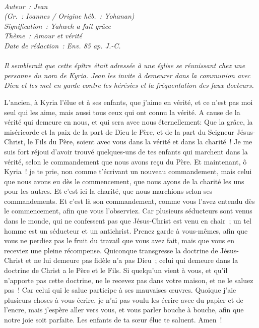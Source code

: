 \BFont
\noindent\hrulefill
{\footnotesize
\textit{
\bigskip
{\centering{}
\\Auteur~: Jean
\\(Gr.~: Ioannes / Origine héb.~: Yohanan)
\\Signification~: Yahweh a fait grâce
\\Thème~: Amour et vérité
\\Date de rédaction~: Env. 85 ap. J.-C.\\}
}
\textit{
\\Il semblerait que cette épître était adressée à une église se réunissant chez une personne du nom de Kyria. Jean les invite à demeurer dans la communion avec Dieu et les met en garde contre les hérésies et la fréquentation des faux docteurs.\bigskip
}
}
\par\nobreak\noindent\hrulefill
\begin{multicols}{2}
\VerseOne{}L'ancien, à Kyria l'élue et à ses enfants, que j'aime en vérité, et ce n'est pas moi seul qui les aime, mais aussi tous ceux qui ont connu la vérité.
A cause de la vérité qui demeure en nous, et qui sera avec nous éternellement:
Que la grâce, la miséricorde et la paix de la part de Dieu le Père, et de la part du Seigneur Jésus-Christ, le Fils du Père, soient avec vous dans la vérité et dans la charité~!
Je me suis fort réjoui d'avoir trouvé quelques-uns de tes enfants qui marchent dans la vérité, selon le commandement que nous avons reçu du Père.
Et maintenant, ô Kyria~! je te prie, non comme t'écrivant un nouveau commandement, mais celui que nous avons eu dès le commencement, que nous ayons de la charité les uns pour les autres.
Et c'est ici la charité, que nous marchions selon ses commandements. Et c'est là son commandement, comme vous l'avez entendu dès le commencement, afin que vous l'observiez.
Car plusieurs séducteurs sont venus dans le monde, qui ne confessent pas que Jésus-Christ est venu en chair~; un tel homme est un séducteur et un antichrist.
Prenez garde à vous-mêmes, afin que vous ne perdiez pas le fruit du travail que vous avez fait, mais que vous en receviez une pleine récompense.
Quiconque transgresse la doctrine de Jésus-Christ et ne lui demeure pas fidèle n'a pas Dieu~; celui qui demeure dans la doctrine de Christ a le Père et le Fils.
Si quelqu'un vient à vous, et qu'il n'apporte pas cette doctrine, ne le recevez pas dans votre maison, et ne le saluez pas~!
Car celui qui le salue participe à ses mauvaises œuvres.
Quoique j'aie plusieurs choses à vous écrire, je n'ai pas voulu les écrire avec du papier et de l'encre, mais j'espère aller vers vous, et vous parler bouche à bouche, afin que notre joie soit parfaite.
Les enfants de ta sœur élue te saluent. Amen~!
\PPE{}
\end{multicols}
